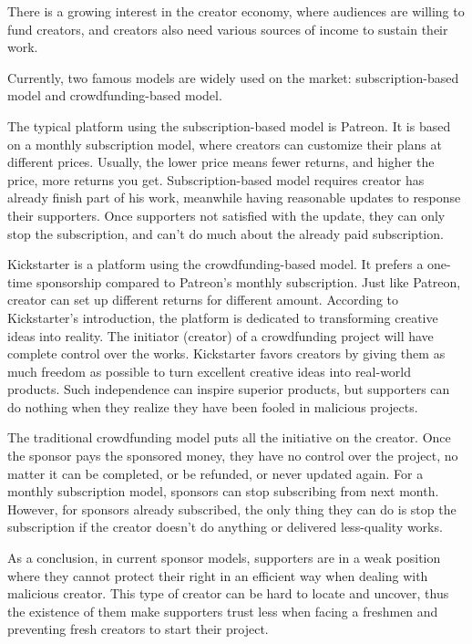 There is a growing interest in the creator economy, where audiences are
willing to fund creators, and creators also need various sources of income
to sustain their work.

Currently, two famous models are widely used on the market: subscription-based
model and crowdfunding-based model.

The typical platform using the subscription-based model is Patreon.
It is based on a monthly subscription model, where creators can customize
their plans at different prices.
Usually, the lower price means fewer returns, and higher the price, more 
returns you get.
Subscription-based model requires creator has already finish part of his work,
meanwhile having reasonable updates to response their supporters.
Once supporters not satisfied with the update, they can only stop the subscription,
and can't do much about the already paid subscription.

Kickstarter is a platform using the crowdfunding-based model.
It prefers a one-time sponsorship compared to Patreon's monthly subscription.
Just like Patreon, creator can set up different returns for different amount.
According to Kickstarter's introduction\cite{kickstarter_about}, the platform
is dedicated to transforming creative ideas into reality.
The initiator (creator) of a crowdfunding project will have complete control
over the works.
Kickstarter favors creators by giving them as much freedom as
possible to turn excellent creative ideas into real-world products.
Such independence can inspire superior products, but supporters can do
nothing when they realize they have been fooled in malicious projects.

The traditional crowdfunding model puts all the initiative on the creator.
Once the sponsor pays the sponsored money, they have no control over the
project, no matter it can be completed, or be refunded, or never updated again.
For a monthly subscription model, sponsors can stop subscribing from
next month.
However, for sponsors already subscribed, the only thing they can do is stop
the subscription if the creator doesn't do anything or delivered less-quality
works.

As a conclusion, in current sponsor models, supporters are in a weak position
where they cannot protect their right in an efficient way when dealing with
malicious creator.
This type of creator can be hard to locate and uncover, thus the existence of them
make supporters trust less when facing a freshmen and preventing fresh creators
to start their project.
